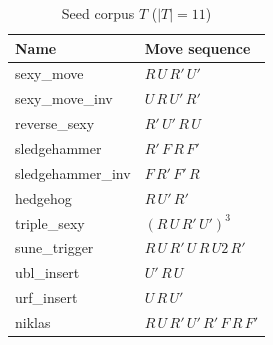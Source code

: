\documentclass[10pt,conference]{article}
\begin{document}
\begin{table}[h]
\centering
\caption{Seed corpus $T$ ($|T|=11$)}
\label{tab:corpus}
\begin{tabular}{ll}
\toprule
Name & Move sequence \\
\midrule
sexy\_move & $R\,U\,R'\,U'$ \\
sexy\_move\_inv & $U\,R\,U'\,R'$ \\
reverse\_sexy & $R'\,U'\,R\,U$ \\
sledgehammer & $R'\,F\,R\,F'$ \\
sledgehammer\_inv & $F\,R'\,F'\,R$ \\
hedgehog & $R\,U'\,R'$ \\
triple\_sexy & $(R\,U\,R'\,U')^3$ \\
sune\_trigger & $R\,U\,R'\,U\,R\,U2\,R'$ \\
ubl\_insert & $U'\,R\,U$ \\
urf\_insert & $U\,R\,U'$ \\
niklas & $R\,U\,R'\,U'\,R'\,F\,R\,F'$ \\
\bottomrule
\end{tabular}
\end{table}
\end{document}
